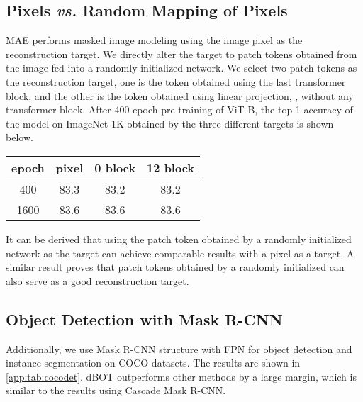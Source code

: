 \documentclass[10pt,twocolumn,letterpaper]{article}
\def\ourmethod{{dBOT}\xspace}
\begin{document}
\subsection{Pixels \textit{vs.} Random Mapping of Pixels}
\label{ap:pixel}
MAE performs masked image modeling using the image pixel as the reconstruction target. 
We directly alter the target to patch tokens obtained from the image fed into a randomly initialized network. 
We select two patch tokens as the reconstruction target, one is the token obtained using the last transformer block, and the other is the token obtained using linear projection, \ie, without any transformer block.
After 400 epoch pre-training of ViT-B, the top-1 accuracy of the model on ImageNet-1K obtained by the three different targets is shown below.
\begin{table}[h]
    \vspace{-0.5em}
    \begin{center}
    \setlength{\tabcolsep}{4.5mm}
    \begin{tabular}{cccc}
        epoch & pixel & 0 block & 12 block \\
        \hline
        400 & 83.3 & 83.2 & 83.2 \\
        1600 & 83.6 & 83.6 & 83.6
    \end{tabular}
    \end{center}
\vspace{-0.7cm}
\end{table}

It can be derived that using the patch token obtained by a randomly initialized network as the target can achieve comparable results with a pixel as a target. 
A similar result proves that patch tokens obtained by a randomly initialized can also serve as a good reconstruction target.

\subsection{Object Detection with Mask R-CNN}
\label{ap: maskrcnn coco}
Additionally, we use Mask R-CNN structure with FPN for object detection and instance segmentation on COCO datasets. 
The results are shown in \cref{app:tab:cocodet}. \ourmethod outperforms other methods by a large margin, which is similar to the results using Cascade Mask R-CNN.
\end{document}
